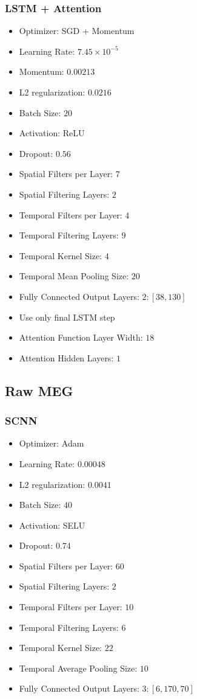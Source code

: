 \subsubsection{LSTM + Attention}

\begin{itemize}
\item Optimizer: SGD + Momentum
\item Learning Rate: $7.45 \times 10^{-5}$
\item Momentum: $0.00213$
\item L2 regularization: $0.0216$
\item Batch Size: $20$
\item Activation: ReLU
\item Dropout: $0.56$
\item Spatial Filters per Layer: $7$
\item Spatial Filtering Layers: $2$
\item Temporal Filters per Layer: $4$
\item Temporal Filtering Layers: $9$
\item Temporal Kernel Size: $4$
\item Temporal Mean Pooling Size: $20$
\item Fully Connected Output Layers: $2: [38, 130]$
\item Use only final LSTM step
\item Attention Function Layer Width: $18$
\item Attention Hidden Layers: $1$
\end{itemize}

\subsection{Raw MEG}

\subsubsection{SCNN}

\begin{itemize}
\item Optimizer: Adam
\item Learning Rate: $0.00048$
\item L2 regularization: $0.0041$
\item Batch Size: $40$
\item Activation: SELU
\item Dropout: $0.74$
\item Spatial Filters per Layer: $60$
\item Spatial Filtering Layers: $2$
\item Temporal Filters per Layer: $10$
\item Temporal Filtering Layers: $6$
\item Temporal Kernel Size: $22$
\item Temporal Average Pooling Size: $10$
\item Fully Connected Output Layers: $3: [6, 170, 70]$
\end{itemize}

